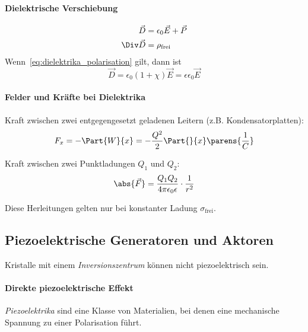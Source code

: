 		\paragraph{Dielektrische Verschiebung} %
			\begin{align*}
				\vec D &= \epsilon_0 \vec E + \vec P \\
				\Div \vec D &= \rho_{\text{frei}}
			\end{align*}
			Wenn~\eqref{eq:dielektrika_polarisation} gilt, dann ist
			\begin{equation*}
				\vec D = \epsilon_0(1+\chi) \vec E = \epsilon\epsilon_0 \vec E
			\end{equation*}
		
		\paragraph{Felder und Kräfte bei Dielektrika} %
			Kraft zwischen zwei entgegengesetzt geladenen Leitern (z.B. Kondensatorplatten):
			\begin{equation*}
				F_x = - \Part{W}{x} = - \frac{Q^2}{2} \Part{}{x} \parens{\frac{1}{C}}
			\end{equation*}
			
			Kraft zwischen zwei Punktladungen $Q_1$ und $Q_2$:
			\begin{equation*}
				\abs{\vec F} = \frac{Q_1 Q_2}{4\pi\epsilon_0\epsilon} \cdot \frac{1}{r^2}
			\end{equation*}
		
		\begin{bemerkung} Diese Herleitungen gelten nur bei konstanter Ladung $\sigma_{\text{frei}}$.
			
		\end{bemerkung}
	\subsection{Piezoelektrische Generatoren und Aktoren} %
		Kristalle mit einem \emph{Inversionszentrum} können nicht piezoelektrisch sein.
		
		\paragraph{Direkte piezoelektrische Effekt} %
			\emph{Piezoelektrika} sind eine Klasse von Materialien, bei denen eine mechanische Spannung zu einer Polarisation führt.
			
